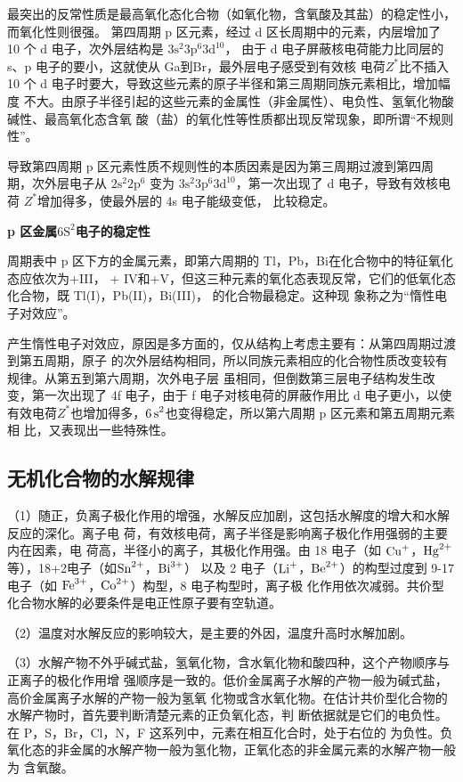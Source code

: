 \documentclass[
  10pt,
  twoside,
  openany,
  b5paper, %
  colorscheme = basic, %
  xits = false,
]{qyxf-book}
\begin{document}
最突出的反常性质是最高氧化态化合物（如氧化物，含氧酸及其盐）的稳定性小，而氧化性则很强。
第四周期 p 区元素，经过 d 区长周期中的元素，内层增加了 10 个 d 电子，次外层结构是 $\mathrm{3s^2 3p^6 3d^{10}}$，
由于 d 电子屏蔽核电荷能力比同层的 s、p 电子的要小，这就使从 Ga到Br，最外层电子感受到有效核
电荷$Z^\ast$比不插入 10 个 d 电子时要大，导致这些元素的原子半径和第三周期同族元素相比，增加幅度
不大。由原子半径引起的这些元素的金属性（非金属性）、电负性、氢氧化物酸碱性、最高氧化态含氧
酸（盐）的氧化性等性质都出现反常现象，即所谓“不规则性”。

导致第四周期 p 区元素性质不规则性的本质因素是因为第三周期过渡到第四周期，次外层电子从 $\mathrm{2s^2 2p^6}$
变为 $\mathrm{3s^2 3p^6 3d^{10}}$，第一次出现了 d 电子，导致有效核电荷 $Z^\ast$增加得多，使最外层的 4s 电子能级变低，
比较稳定。

\textbf{p 区金属$ \mathrm{6S^2}$电子的稳定性}

周期表中 p 区下方的金属元素，即第六周期的 Tl，Pb，Bi在化合物中的特征氧化态应依次为+III，
+ IV和+V，但这三种元素的氧化态表现反常，它们的低氧化态化合物，既 Tl(I)，Pb(II)，Bi(III)，
的化合物最稳定。这种现
象称之为“惰性电子对效应”。

产生惰性电子对效应，原因是多方面的，仅从结构上考虑主要有：从第四周期过渡到第五周期，原子
的次外层结构相同，所以同族元素相应的化合物性质改变较有规律。从第五到第六周期，次外电子层
虽相同，但倒数第三层电子结构发生改变，第一次出现了 4f 电子，由于 f 电子对核电荷的屏蔽作用比
d 电子更小，以使有效电荷$Z^\ast$也增加得多，$\ce{6s^2}$也变得稳定，所以第六周期 p 区元素和第五周期元素相
比，又表现出一些特殊性。

\subsection{无机化合物的水解规律}

（1）随正，负离子极化作用的增强，水解反应加剧，这包括水解度的增大和水解反应的深化。离子电
荷，有效核电荷，离子半径是影响离子极化作用强弱的主要内在因素，电
荷高，半径小的离子，其极化作用强。由 18 电子（如 $\ce{Cu+}$，$\ce{Hg^2+}$等），18+2电子（如$\ce{Sn^2+}$，$\ce{Bi^3+}$）
以及 2 电子（$\ce{Li+}$，$\ce{Be^2+}$）的构型过度到 9-17 电子（如 $\ce{Fe^3+}$，$\ce{Co^2+}$）构型，8 电子构型时，离子极
化作用依次减弱。共价型化合物水解的必要条件是电正性原子要有空轨道。

（2）温度对水解反应的影响较大，是主要的外因，温度升高时水解加剧。

（3）水解产物不外乎碱式盐，氢氧化物，含水氧化物和酸四种，这个产物顺序与正离子的极化作用增
强顺序是一致的。低价金属离子水解的产物一般为碱式盐，高价金属离子水解的产物一般为氢氧
化物或含水氧化物。在估计共价型化合物的水解产物时，首先要判断清楚元素的正负氧化态，判
断依据就是它们的电负性。在 P，S，Br，Cl，N，F 这系列中，元素在相互化合时，处于右位的
为负性。负氧化态的非金属的水解产物一般为氢化物，正氧化态的非金属元素的水解产物一般为
含氧酸。
\end{document}
